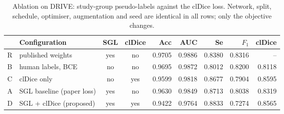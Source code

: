 \begin{table}[!t]
  \caption{Ablation on DRIVE: study-group pseudo-labels against the
  clDice loss. Network, split, schedule, optimiser, augmentation and
  seed are identical in all rows; only the objective changes.}
  \label{tab:ablation}
  \centering
  \renewcommand{\arraystretch}{1.15}
  \setlength{\tabcolsep}{4pt}
  \begin{tabular}{@{} l l c c r r r r r @{}}
    \toprule
    & \textbf{Configuration} & \textbf{SGL} & \textbf{clDice} & \textbf{Acc} & \textbf{AUC} & \textbf{Se} & \textbf{$F_1$} & \textbf{clDice} \\
    \midrule
    R & published weights & yes & no & 0.9705 & 0.9886 & 0.8380 & 0.8316 & -- \\
    B & human labels, BCE & no & no & 0.9695 & 0.9872 & 0.8012 & 0.8200 & 0.8118 \\
    C & clDice only & no & yes & 0.9599 & 0.9818 & 0.8677 & 0.7904 & 0.8595 \\
    A & SGL baseline (paper loss) & yes & no & 0.9630 & 0.9849 & 0.8713 & 0.8038 & 0.8319 \\
    D & SGL + clDice (proposed) & yes & yes & 0.9422 & 0.9764 & 0.8833 & 0.7274 & 0.8565 \\
    \bottomrule
  \end{tabular}
\end{table}
